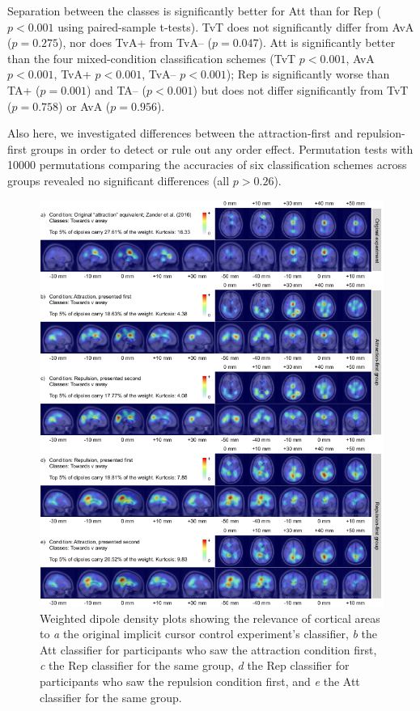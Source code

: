 Separation between the classes is significantly better for Att than for Rep ($p<0.001$ using paired-sample t-tests). TvT does not significantly differ from AvA ($p=0.275$), nor does TvA+ from TvA-- ($p=0.047$). Att is significantly better than the four mixed-condition classification schemes (TvT $p<0.001$, AvA $p<0.001$, TvA+ $p<0.001$, TvA-- $p<0.001$); Rep is significantly worse than TA+ ($p=0.001$) and TA-- ($p<0.001$) but does not differ significantly from TvT ($p=0.758$) or AvA ($p=0.956$). 

Also here, we investigated differences between the attraction-first and repulsion-first groups in order to detect or rule out any order effect. Permutation tests with 10000 permutations comparing the accuracies of six classification schemes across groups revealed no significant differences (all $p>0.26$).

\begin{figure}[p]
    \centering
    \includegraphics[width=\textwidth]{figures/salval-wdd-within.pdf}
    \caption[Weighted dipole density plots for the within-condition classifiers.]{Weighted dipole density plots showing the relevance of cortical areas to \emph{a} the original implicit cursor control experiment's classifier, \emph{b} the Att classifier for participants who saw the attraction condition first, \emph{c} the Rep classifier for the same group, \emph{d} the Rep classifier for participants who saw the repulsion condition first, and \emph{e} the Att classifier for the same group.}
    \label{salval:fig:wdd-within}
\end{figure}


